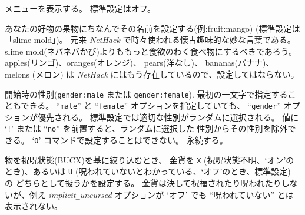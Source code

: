 メニューを表示する。
標準設定はオフ。
\item[\ib{fruit}]
あなたの好物の果物にちなんでその名前を設定する(例:fruit:mango)
(標準設定は「slime mold」)。
元来 {\it NetHack\/} で時々使われる懐古趣味的な妙な言葉である。
slime mold(ネバネバかび)よりももっと食欲のわく食べ物にするべきであろう。
apples(リンゴ)、oranges(オレンジ)、 pears(洋なし)、 bananas(バナナ)、
melons (メロン) は {\it NetHack\/} にはもう存在しているので、設定してはならない。
\item[\ib{gender}]
開始時の性別({\tt gender:male} または {\tt gender:female}).
最初の一文字で指定することもできる。
``{\tt male}'' と ``{\tt female}'' オプションを指定していても、
``{\tt gender}'' オプションが優先される。
標準設定では適切な性別がランダムに選択される。
値に `{\tt !}' または ``{\tt no}'' を前置すると、ランダムに選択した
性別からその性別を除外できる。
`{\tt O}' コマンドで設定することはできない。
永続する。
\item[\ib{goldX}]
物を祝呪状態(BUCX)を基に絞り込むとき、
金貨を
{\tt X} (祝呪状態不明、`オン'のとき)、あるいは
{\tt U} (呪われていないとわかっている、`オフ'のとき、標準設定) の
どちらとして扱うかを設定する。
金貨は決して祝福されたり呪われたりしないが、例え
{\it implicit\verb+_+uncursed\/} オプションが `オフ' でも
``呪われていない'' とは表示されない。
\item[\ib{help}]
